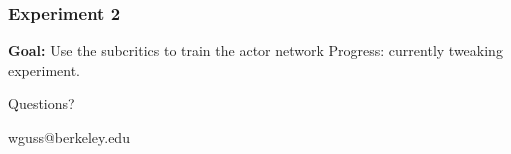 \documentclass{beamer}
\numberwithin{equation}{subsection}
\numberwithin{theorem}{subsection}
\begin{document}
\begin{frame}
    \frametitle{Experiment 2}
    \textbf{Goal:} Use the subcritics to train the actor network
    Progress: currently tweaking experiment.
\end{frame}

\begin{frame}
\Huge{\centerline{Questions?}}
\Small\centerline{wguss@berkeley.edu}
\end{frame}

\end{document}
